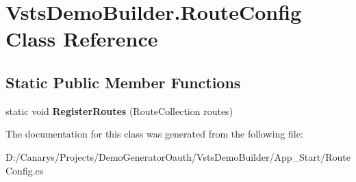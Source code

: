 \hypertarget{class_vsts_demo_builder_1_1_route_config}{}\section{Vsts\+Demo\+Builder.\+Route\+Config Class Reference}
\label{class_vsts_demo_builder_1_1_route_config}
\subsection*{Static Public Member Functions}
\begin{DoxyCompactItemize}
\item 
\mbox{\label{class_vsts_demo_builder_1_1_route_config_a7ef2583f903b80260413a0d34a0c04fe}} 
static void {\bfseries Register\+Routes} (Route\+Collection routes)
\end{DoxyCompactItemize}


The documentation for this class was generated from the following file\+:\begin{DoxyCompactItemize}
\item 
D\+:/\+Canarys/\+Projects/\+Demo\+Generator\+Oauth/\+Vsts\+Demo\+Builder/\+App\+\_\+\+Start/Route\+Config.\+cs\end{DoxyCompactItemize}
